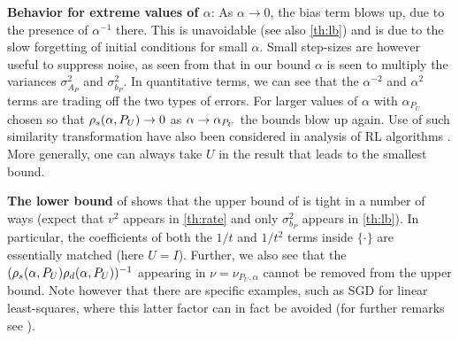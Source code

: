 \textbf{Behavior for extreme values of $\alpha$}: As $\alpha\to 0$, the bias term blows up, due to the presence of $\alpha^{-1}$ there. This is unavoidable (see also \cref{th:lb}) and is due to the slow forgetting of initial conditions for small $\alpha$. Small step-sizes are however useful to suppress noise, as seen from that in our bound $\alpha$ is seen to multiply the variances $\sigma^2_{A_P}$ and $\sigma^2_{b_P}$. In quantitative terms, we can see that the $\alpha^{-2}$ and $\alpha^2$ terms are trading off the two types of errors. For larger values of $\alpha$ with $\alpha_{P_U}$ chosen so that $\rho_s(\alpha,P_U)\rightarrow 0$ as $\alpha\rightarrow \alpha_{P_U}$ the bounds blow up again. 
Use of such similarity transformation have also been considered in analysis of RL algorithms \cite{lihong}. More generally, one can always take $U$ in the result that leads to the smallest bound.
\begin{comment}
\textbf{Proof Sketch:} We can expand the MSE as $\EE{\norm{\eh_t}^2}=\tfrac{1}{(t+1)^2}\, \ip{ \textstyle\sum_{s=0}^t e_s,\textstyle\sum_{s=0}^t e_s}\,,$
where $\eh_t = \thh_t-\ts$ and $e_t = \theta_t-\ts$, and the inner product is a summation of \emph{diagonal} terms $\EE{\ip{e_s,e_s}}$ and \emph{cross} terms of $\EE{\ip{e_s,e_q}}$, $s\neq q$. Since, we also use a basis transformation via $U$, the growth of the diagonal terms and the cross terms depends on the spectral norm of the random matrices $I-\alpha \Lambda_t$ and that of the deterministic matrix $I-\alpha \Lambda$, respectively. This explains the reason as to why $\rhos{P_U}$ and $\rhod{P_U} $ appear in the bounds.
\end{comment}
\textbf{The lower bound} of  shows that the upper bound of  is tight in a number of ways (expect that $v^2$ appears in \cref{th:rate} and only $\sigma^2_{b_P}$ appears in \cref{th:lb}).
In particular, the coefficients of both the $1/t$ and $1/t^2$ terms inside $\{ \cdot \}$ are essentially matched (here $U=I$).
Further, we also see that the $(\rho_s(\alpha,P_U)\rho_d(\alpha,P_U))^{-1}$ appearing in $\nu = \nu_{P_U,\alpha}$ cannot be removed from the upper bound. 
Note however that there are specific examples, such as SGD for linear least-squares,
where this latter factor can in fact be avoided (for further remarks see ).



